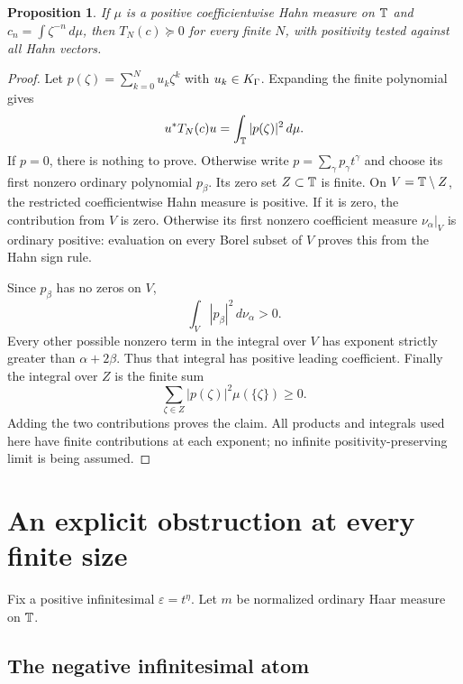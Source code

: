 \documentclass[11pt,letterpaper]{article}
\newtheorem{proposition}[theorem]{Proposition}
\theoremstyle{definition}
\newcommand{\eps}{\varepsilon}
\newcommand{\dd}{\,d}
\numberwithin{equation}{section}
\begin{document}
\begin{proposition}\label{herg:prop:measuretoeplitz}
If $\mu$ is a positive coefficientwise Hahn measure on $\mathbb T$ and $c_n=\int\zeta^{-n}\dd\mu$, then $T_N(c)\succeq0$ for every finite $N$, with positivity tested against all Hahn vectors.
\end{proposition}
\begin{proof}
Let $p(\zeta)=\sum_{k=0}^N u_k\zeta^k$ with $u_k\in K_\Gamma$. Expanding the finite polynomial gives
\[
 u^*T_N(c)u=\int_\T|p(\zeta)|^2\dd\mu.
\]
If $p=0$, there is nothing to prove. Otherwise write $p=\sum_\gamma p_\gamma t^\gamma$ and choose its first nonzero ordinary polynomial $p_\beta$. Its zero set $Z\subset\mathbb T$ is finite. On $V=\mathbb T\setminus Z$, the restricted coefficientwise Hahn measure is positive. If it is zero, the contribution from $V$ is zero. Otherwise its first nonzero coefficient measure $\nu_\alpha|_V$ is ordinary positive: evaluation on every Borel subset of $V$ proves this from the Hahn sign rule.

Since $p_\beta$ has no zeros on $V$,
\[
 \int_V |p_\beta|^2\dd\nu_\alpha>0.
\]
Every other possible nonzero term in the integral over $V$ has exponent strictly greater than $\alpha+2\beta$. Thus that integral has positive leading coefficient. Finally the integral over $Z$ is the finite sum
\[
 \sum_{\zeta\in Z}|p(\zeta)|^2\mu(\{\zeta\})\ge0.
\]
Adding the two contributions proves the claim. All products and integrals used here have finite contributions at each exponent; no infinite positivity-preserving limit is being assumed.
\end{proof}

\section{An explicit obstruction at every finite size}
\label{herg:sec:counterexample}

Fix a positive infinitesimal $\eps=t^\eta$. Let $m$ be normalized ordinary Haar measure on $\mathbb T$.

\subsection{The negative infinitesimal atom}
\end{document}
